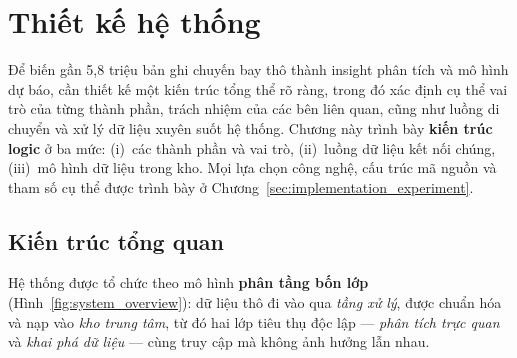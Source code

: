 \clearpage
\section{Thiết kế hệ thống}
\label{sec:system_design}

Để biến gần 5{,}8 triệu bản ghi chuyến bay thô thành insight phân tích
và mô hình dự báo, cần thiết kế một kiến trúc tổng thể rõ ràng, trong đó xác định cụ thể vai trò của từng thành phần, trách nhiệm của các bên liên quan, cũng như luồng di chuyển và xử lý dữ liệu xuyên suốt hệ thống.
Chương này trình bày \textbf{kiến trúc logic} ở ba mức:
(i)~các thành phần và vai trò,
(ii)~luồng dữ liệu kết nối chúng,
(iii)~mô hình dữ liệu trong kho.
Mọi lựa chọn công nghệ, cấu trúc mã nguồn và tham số cụ thể
được trình bày ở Chương~\ref{sec:implementation_experiment}.

\subsection{Kiến trúc tổng quan}

Hệ thống được tổ chức theo mô hình \textbf{phân tầng bốn lớp}
(Hình~\ref{fig:system_overview}):
dữ liệu thô đi vào qua \textit{tầng xử lý}, được chuẩn hóa và nạp vào \textit{kho trung tâm},
từ đó hai lớp tiêu thụ độc lập --- \textit{phân tích trực quan} và \textit{khai phá dữ liệu} ---
cùng truy cập mà không ảnh hưởng lẫn nhau.





